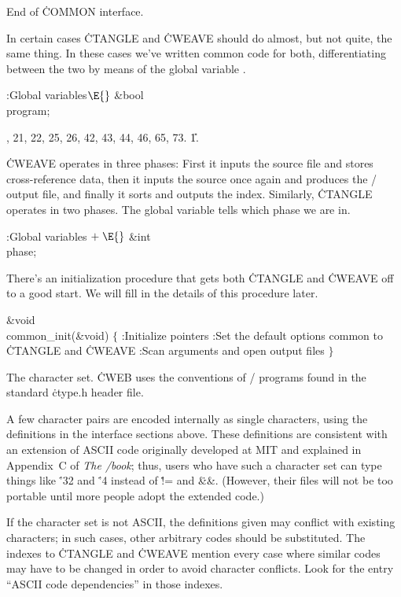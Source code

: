 End of \.{COMMON} interface.

\fi

In certain cases \.{CTANGLE} and \.{CWEAVE} should do almost, but not
quite, the same thing.  In these cases we've written common code for
both, differentiating between the two by means of the global variable
.

\Y\B\4:Global variables\X${}\E{}$\6
\&{bool} \\{program};\par
{}, 21, 22, 25, 26, 42, 43, 44, 46, 65, 73.
\U1.\fi

\.{CWEAVE} operates in three phases: First it inputs the source
file and stores cross-reference data, then it inputs the source once again and
produces the \TEX/ output file, and finally it sorts and outputs the index.
Similarly, \.{CTANGLE} operates in two phases.
The global variable  tells which phase we are in.

\Y\B\4:Global variables\X${}\mathrel+\E{}$\6
\&{int} \\{phase};\par
\fi

There's an initialization procedure that gets both \.{CTANGLE} and
\.{CWEAVE} off to a good start. We will fill in the details of this
procedure later.

\Y\B\1\1\&{void} \\{common\_init}(\&{void})\2\2\6
${}\{{}$\1\6
:Initialize pointers\X\6
:Set the default options common to \.{CTANGLE} and \.{CWEAVE}\X\6
:Scan arguments and open output files\X\6
\4${}\}{}$\2\par
\fi

The character set.
\.{CWEB} uses the conventions of \CEE/ programs found in the standard
\.{ctype.h} header file.

A few character pairs are encoded internally as single characters,
using the definitions in the interface sections above. These definitions
are consistent with an extension of ASCII code originally developed at
MIT and explained in Appendix~C of {\sl The \TEX/book\/}; thus, users
who have such a character set can type things like \.{\char'32} and
\.{\char'4} instead of \.{!=} and \.{\&\&}. (However, their files will
not be too portable until more people adopt the extended code.)

If the character set is not ASCII, the definitions given may conflict
with existing characters; in such cases, other arbitrary codes should be
substituted. The indexes to \.{CTANGLE} and \.{CWEAVE} mention every
case where similar codes may have to be changed in order to
avoid character conflicts. Look for the entry ``ASCII code dependencies''
in those indexes.


